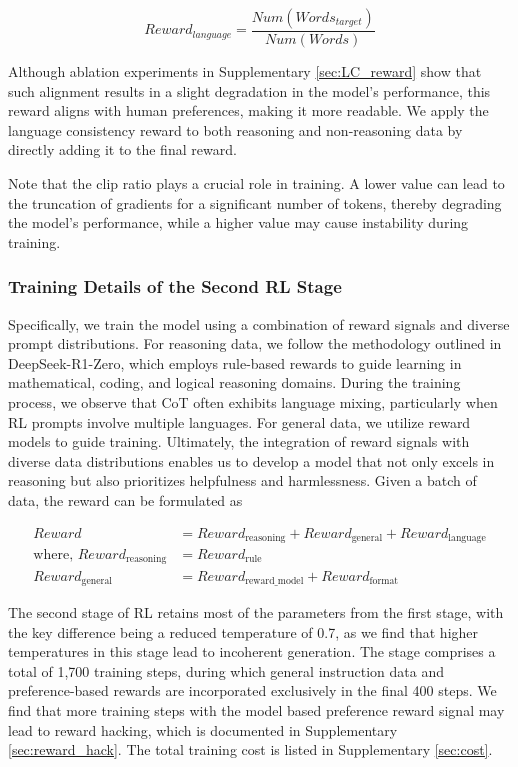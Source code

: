 \begin{equation}
    Reward_{language} = \frac{Num(Words_{target})}{Num(Words)}
\end{equation}

Although ablation experiments in Supplementary \ref{sec:LC_reward} show that such alignment results in a slight degradation in the model's performance, this reward aligns with human preferences, making it more readable. We apply the language consistency reward to both reasoning and non-reasoning data by directly adding it to the final reward. 

Note that the clip ratio plays a crucial role in training.  A lower value can lead to the truncation of gradients for a significant number of tokens, thereby degrading the model's performance, while a higher value may cause instability during training.

\subsubsection{Training Details of the Second RL Stage }\label{sec: r1-2-rl} Specifically, we train the model using a combination of reward signals and diverse prompt distributions. For reasoning data, we follow the methodology outlined in DeepSeek-R1-Zero, which employs rule-based rewards to guide learning in mathematical, coding, and logical reasoning domains. During the training process, we observe that CoT often exhibits language mixing, particularly when RL prompts involve multiple languages. For general data, we utilize reward models to guide training. Ultimately, the integration of reward signals with diverse data distributions enables us to develop a model that not only excels in reasoning but also prioritizes helpfulness and harmlessness. Given a batch of data, the reward can be formulated as

\begin{align}
Reward &= Reward_{\text{reasoning}} + Reward_{\text{general}} + Reward_{\text{language}}\\
\text{where, } Reward_{\text{reasoning}} &= Reward_{\text{rule}}\\
Reward_{\text{general}} &= Reward_{\text{reward\_model}} + Reward_{\text{format}}
\end{align}

The second stage of RL retains most of the parameters from the first stage, with the key difference being a reduced temperature of 0.7, as we find that higher temperatures in this stage lead to incoherent generation. The stage comprises a total of 1,700 training steps, during which general instruction data and preference-based rewards are incorporated exclusively in the final 400 steps. We find that more training steps with the model based preference reward signal may lead to reward hacking, which is documented in Supplementary \ref{sec:reward_hack}. The total training cost is listed in Supplementary \ref{sec:cost}.

